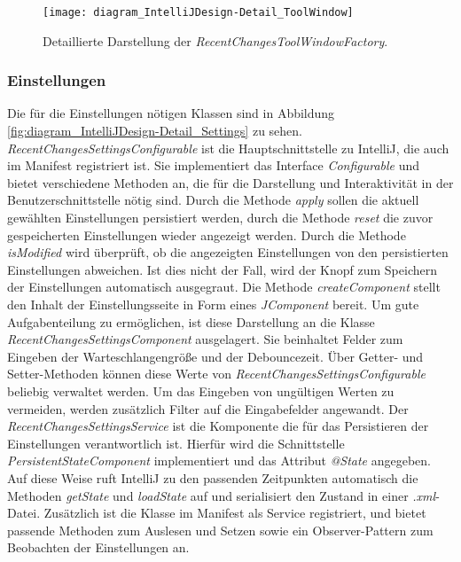 \begin{figure}
    \centering
    \texttt{[image: diagram\_IntelliJDesign-Detail\_ToolWindow]}
    \caption{Detaillierte Darstellung der \emph{RecentChangesToolWindowFactory}.}
    \label{fig:diagram_IntelliJDesign-Detail_ToolWindow}
\end{figure}

\subsubsection{Einstellungen}

Die für die Einstellungen nötigen Klassen sind in Abbildung
\ref{fig:diagram_IntelliJDesign-Detail_Settings} zu sehen.
\emph{RecentChangesSettingsConfigurable} ist die Hauptschnittstelle 
zu IntelliJ, die auch im Manifest registriert ist. 
Sie implementiert das Interface \emph{Configurable}
und bietet verschiedene Methoden an, die für die Darstellung
und Interaktivität in der Benutzerschnittstelle nötig sind.
Durch die Methode \emph{apply} sollen die aktuell gewählten Einstellungen
persistiert werden, durch die Methode \emph{reset} die 
zuvor gespeicherten Einstellungen wieder angezeigt werden.
Durch die Methode \emph{isModified} wird überprüft, ob die angezeigten
Einstellungen von den persistierten Einstellungen abweichen. 
Ist dies nicht der Fall, wird der Knopf zum Speichern der Einstellungen
automatisch ausgegraut. Die Methode \emph{createComponent} stellt
den Inhalt der Einstellungsseite in Form eines \emph{JComponent} bereit.
Um gute Aufgabenteilung zu ermöglichen, ist diese Darstellung an die 
Klasse \emph{RecentChangesSettingsComponent} ausgelagert. Sie beinhaltet
Felder zum Eingeben der Warteschlangengröße und der Debouncezeit.
Über Getter- und Setter-Methoden können diese Werte von 
\emph{RecentChangesSettingsConfigurable} beliebig verwaltet werden.
Um das Eingeben von ungültigen Werten zu vermeiden, werden zusätzlich
Filter auf die Eingabefelder angewandt.
Der \emph{RecentChangesSettingsService} ist die Komponente die für das 
Persistieren der Einstellungen verantwortlich ist. Hierfür
wird die Schnittstelle \emph{PersistentStateComponent} implementiert
und das Attribut \emph{@State} angegeben. Auf diese Weise ruft
IntelliJ zu den passenden Zeitpunkten automatisch die Methoden
\emph{getState} und \emph{loadState} auf und serialisiert den Zustand
in einer \emph{.xml}-Datei.
Zusätzlich ist die Klasse im Manifest als Service registriert, und bietet
passende Methoden zum Auslesen und Setzen sowie ein Observer-Pattern
zum Beobachten der Einstellungen an.

